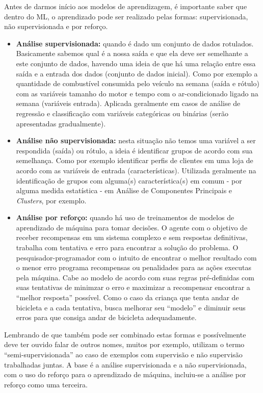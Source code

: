 \documentclass[
  openany]{book}
\begin{document}
Antes de darmos início aos modelos de aprendizagem, é importante saber que dentro do ML, o aprendizado pode ser realizado pelas formas: supervisionada, não supervisionada e por reforço.

\begin{itemize}
\item
  \textbf{Análise supervisionada:} quando é dado um conjunto de dados rotulados. Basicamente sabemos qual é a nossa saída e que ela deve ser semelhante a este conjunto de dados, havendo uma ideia de que há uma relação entre essa saída e a entrada dos dados (conjunto de dados inicial). Como por exemplo a quantidade de combustível consumida pelo veículo na semana (saída e rótulo) com as variáveis tamanho do motor e tempo com o ar-condicionado ligado na semana (variáveis entrada). Aplicada geralmente em casos de análise de regressão e classificação com variáveis categóricas ou binárias (serão apresentadas gradualmente).
\item
  \textbf{Análise não supervisionada:} nesta situação não temos uma variável a ser respondida (saída) ou rótulo, a ideia é identificar grupos de acordo com sua semelhança. Como por exemplo identificar perfis de clientes em uma loja de acordo com as variáveis de entrada (características). Utilizada geralmente na identificação de grupos com alguma(s) característica(s) em comum - por alguma medida estatística - em Análise de Componentes Principais e \emph{Clusters}, por exemplo.
\item
  \textbf{Análise por reforço:} quando há uso de treinamentos de modelos de aprendizado de máquina para tomar decisões. O agente com o objetivo de receber recompensas em um sistema complexo e sem respostas definitivas, trabalha com tentativa e erro para encontrar a solução do problema. O pesquisador-programador com o intuito de encontrar o melhor resultado com o menor erro programa recompensas ou penalidades para as ações executas pela máquina. Cabe ao modelo de acordo com suas regras pré-definidas com suas tentativas de minimzar o erro e maximizar a recompensar encontrar a ``melhor resposta'' possível. Como o caso da criança que tenta andar de bicicleta e a cada tentativa, busca melhorar seu ``modelo'' e diminuir seus erros para que consiga andar de bicicleta adequadamente.
\end{itemize}

Lembrando de que também pode ser combinado estas formas e possívelmente deve ter ouvido falar de outros nomes, muitos por exemplo, utilizam o termo ``semi-supervisionada'' ao caso de exemplos com supervisão e não supervisão trabalhadas juntas. A base é a análise supervisionada e a não supervisionada, com o uso do reforço para o aprendizado de máquina, incluiu-se a análise por reforço como uma terceira.
\end{document}
